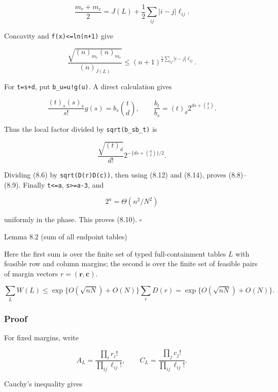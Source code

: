 \documentclass[
  11pt,
  a4paper,
]{article}
\begin{document}
\[
 \frac{m_r+m_c}{2}
 =J(L)+\frac12\sum_{ij}|i-j|\ell_{ij}.                  \tag{8.11}
\]

Concavity and \texttt{f\textquotesingle{}(x)\textless{}=ln(n+1)} give

\[
 \frac{\sqrt{(n)_{m_r}(n)_{m_c}}}{(n)_{J(L)}}
 \le(n+1)^{\frac12\sum_{ij}|i-j|\ell_{ij}}.            \tag{8.12}
\]

For \texttt{t=s+d}, put \texttt{b\_u=u!g(u)}. A direct calculation gives

\[
 \frac{(t)_s(s)_s}{s!}g(s)=b_s\binom td,\qquad
 \frac{b_t}{b_s}=(t)_d2^{ds+\binom d2}.                 \tag{8.13}
\]

Thus the local factor divided by \texttt{sqrt(b\_sb\_t)} is

\[
 \frac{\sqrt{(t)_d}}{d!}2^{-\{ds+\binom d2\}/2}.        \tag{8.14}
\]

Dividing (8.6) by \texttt{sqrt(D(r)D(c))}, then using (8.12) and (8.14),
proves (8.8)--(8.9). Finally \texttt{t\textless{}=a},
\texttt{s\textgreater{}=a-3}, and

\[
 2^a=\Theta(n^2/N^2)                                    \tag{8.15}
\]

uniformly in the phase. This proves (8.10). \(\square\)

{}
\label{lemma-8.2-sum-of-all-endpoint-tables}
\begin{lemmabox}{Lemma 8.2 (sum of all endpoint tables)}

Here the first sum is over the finite set of typed full-containment
tables \(L\) with feasible row and column margins; the second is over
the finite set of feasible pairs of margin vectors
\(r=(\mathbf r,\mathbf c)\).

\[
 \sum_LW(L)\le
 \exp\{O(\sqrt{nN})+O(N)\}\sum_rD(r)
 =\exp\{O(\sqrt{nN})+O(N)\}.                            \tag{8.16}
\]

\end{lemmabox}

\subsubsection{Proof}\label{proof-6}

For fixed margins, write

\[
 A_L=\frac{\prod_i r_i!}{\prod_{ij}\ell_{ij}!},\qquad
 C_L=\frac{\prod_j c_j!}{\prod_{ij}\ell_{ij}!}.        \tag{8.17}
\]

Cauchy's inequality gives
\end{document}
